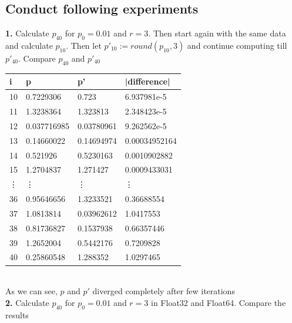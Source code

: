 \documentclass[12pt]{article}
\begin{document}
\subsection*{Conduct following experiments}
\textbf{1. } Calculate $p_{40}$ for $p_0=0.01$ and $r=3$. 
Then start again with the same data and calculate $p_{10}$. Then let $p'_{10} := round(p_{10}, 3)$ and continue computing till $p'_{40}$.
Compare $p_{40}$ and $p'_{40}$\\
\begin{table}[h]
    \centering
    \begin{tabular}{|l|l|l|l|}
    \hline
        i & p & p' & |difference| \\ \hline
        10 & 0.7229306 & 0.723 & 6.937981e-5 \\ \hline
        11 & 1.3238364 & 1.323813 & 2.348423e-5 \\ \hline
        12 & 0.037716985 & 0.03780961 & 9.262562e-5 \\ \hline
        13 & 0.14660022 & 0.14694974 & 0.00034952164 \\ \hline
        14 & 0.521926 & 0.5230163 & 0.0010902882 \\ \hline
        15 & 1.2704837 & 1.271427 & 0.0009433031 \\ \hline
        \vdots & \vdots & \vdots & \vdots \\ \hline
        36 & 0.95646656 & 1.3233521 & 0.36688554 \\ \hline
        37 & 1.0813814 & 0.03962612 & 1.0417553 \\ \hline
        38 & 0.81736827 & 0.1537938 & 0.66357446 \\ \hline
        39 & 1.2652004 & 0.5442176 & 0.7209828 \\ \hline
        40 & 0.25860548 & 1.288352 & 1.0297465 \\ \hline
    \end{tabular}
\end{table}
\\
As we can see, $p$ and $p'$ diverged completely after few iterations\\
\textbf{2. } Calculate $p_{40}$ for $p_0=0.01$ and $r=3$ in Float32 and Float64. Compare the results
\end{document}
